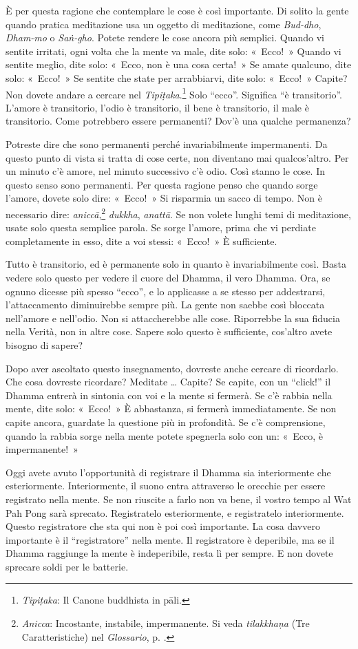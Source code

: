 È per questa ragione che contemplare le cose è così importante. Di
solito la gente quando pratica meditazione usa un oggetto di
meditazione, come \emph{Bud-dho}, \emph{Dham-mo} o \emph{Saṅ-gho}.
Potete rendere le cose ancora più semplici. Quando vi sentite irritati,
ogni volta che la mente va male, dite solo: «~Ecco!~» Quando vi sentite
meglio, dite solo: «~Ecco, non è una cosa certa!~» Se amate qualcuno,
dite solo: «~Ecco!~» Se sentite che state per arrabbiarvi, dite solo:
«~Ecco!~» Capite? Non dovete andare a cercare nel
\emph{Tipiṭaka}.\footnote{\emph{Tipiṭaka}: Il Canone buddhista in pāli.}
Solo ``ecco''. Significa ``è transitorio''. L'amore è transitorio,
l'odio è transitorio, il bene è transitorio, il male è transitorio. Come
potrebbero essere permanenti? Dov'è una qualche permanenza?

Potreste dire che sono permanenti perché invariabilmente impermanenti.
Da questo punto di vista si tratta di cose certe, non diventano mai
qualcos'altro. Per un minuto c'è amore, nel minuto successivo c'è odio.
Così stanno le cose. In questo senso sono permanenti. Per questa ragione
penso che quando sorge l'amore, dovete solo dire: «~Ecco!~» Si risparmia
un sacco di tempo. Non è necessario dire: \emph{aniccā},\footnote{\emph{Anicca}:
  Incostante, instabile, impermanente. Si veda \emph{tilakkhaṇa} (Tre
  Caratteristiche) nel \emph{Glossario}, p. \pageref{glossary-tilakkhana}.} \emph{dukkha}, \emph{anattā}.
Se non volete lunghi temi di meditazione, usate solo questa semplice
parola. Se sorge l'amore, prima che vi perdiate completamente in esso,
dite a voi stessi: «~Ecco!~» È sufficiente.

Tutto è transitorio, ed è permanente solo in quanto è invariabilmente
così. Basta vedere solo questo per vedere il cuore del Dhamma, il vero
Dhamma. Ora, se ognuno dicesse più spesso ``ecco'', e lo applicasse a se
stesso per addestrarsi, l'attaccamento diminuirebbe sempre più. La gente
non saebbe così bloccata nell'amore e nell'odio. Non si attaccherebbe
alle cose. Riporrebbe la sua fiducia nella Verità, non in altre cose.
Sapere solo questo è sufficiente, cos'altro avete bisogno di sapere?

Dopo aver ascoltato questo insegnamento, dovreste anche cercare di
ricordarlo. Che cosa dovreste ricordare? Meditate \ldots{} Capite? Se capite,
con un ``click!'' il Dhamma entrerà in sintonia con voi e la mente si
fermerà. Se c'è rabbia nella mente, dite solo: «~Ecco!~» È abbastanza,
si fermerà immediatamente. Se non capite ancora, guardate la questione
più in profondità. Se c'è comprensione, quando la rabbia sorge nella
mente potete spegnerla solo con un: «~Ecco, è impermanente!~»

Oggi avete avuto l'opportunità di registrare il Dhamma sia interiormente
che esteriormente. Interiormente, il suono entra attraverso le orecchie
per essere registrato nella mente. Se non riuscite a farlo non va bene,
il vostro tempo al Wat Pah Pong sarà sprecato. Registratelo
esteriormente, e registratelo interiormente. Questo registratore che sta
qui non è poi così importante. La cosa davvero importante è il
``registratore'' nella mente. Il registratore è deperibile, ma se il
Dhamma raggiunge la mente è indeperibile, resta lì per sempre. E non
dovete sprecare soldi per le batterie.

